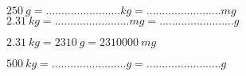 \begin{questions}
		
	
		\question $ \num{250}\  g =........................kg =........................mg $\\
		
		\question $\num{2.31}\  kg =........................mg =........................g $\\
		\begin{solution}
			$\num{2.31}\  kg = \num{2310}\  g = \num{2310000}\  mg $
		\end{solution}
		
		
		
		
		\question $ \num{500}\  kg =........................g =........................ g $\\
		
%		
%		
%		
%		
%		
%		

\end{questions}

